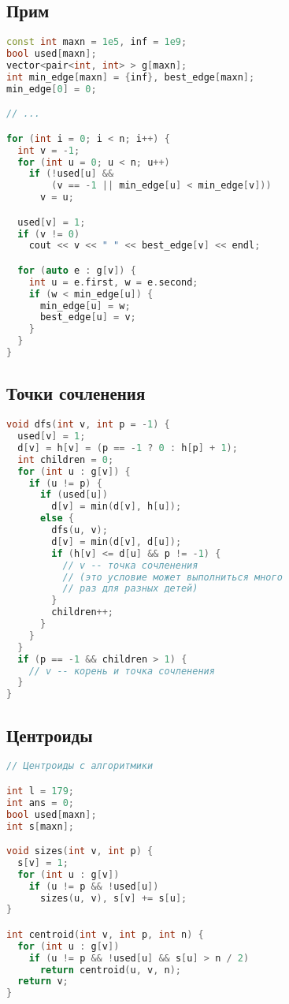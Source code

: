 \documentclass[10pt,a4paper,landscape,twosided]{extarticle}
\begin{document}
\begin{multicols}{3}
\subsection{Прим}
\begin{lstlisting}[language=C++]
const int maxn = 1e5, inf = 1e9;
bool used[maxn];
vector<pair<int, int> > g[maxn];
int min_edge[maxn] = {inf}, best_edge[maxn];
min_edge[0] = 0;

// ...

for (int i = 0; i < n; i++) {
  int v = -1;
  for (int u = 0; u < n; u++)
    if (!used[u] &&
        (v == -1 || min_edge[u] < min_edge[v]))
      v = u;

  used[v] = 1;
  if (v != 0)
    cout << v << " " << best_edge[v] << endl;

  for (auto e : g[v]) {
    int u = e.first, w = e.second;
    if (w < min_edge[u]) {
      min_edge[u] = w;
      best_edge[u] = v;
    }
  }
}
\end{lstlisting}

\subsection{Точки сочленения}
\begin{lstlisting}[language=C++]
void dfs(int v, int p = -1) {
  used[v] = 1;
  d[v] = h[v] = (p == -1 ? 0 : h[p] + 1);
  int children = 0;
  for (int u : g[v]) {
    if (u != p) {
      if (used[u])
        d[v] = min(d[v], h[u]);
      else {
        dfs(u, v);
        d[v] = min(d[v], d[u]);
        if (h[v] <= d[u] && p != -1) {
          // v -- точка сочленения
          // (это условие может выполниться много
          // раз для разных детей)
        }
        children++;
      }
    }
  }
  if (p == -1 && children > 1) {
    // v -- корень и точка сочленения
  }
}
\end{lstlisting}

\subsection{Центроиды}
\begin{lstlisting}[language=C++]
// Центроиды с алгоритмики

int l = 179;
int ans = 0;
bool used[maxn];
int s[maxn];

void sizes(int v, int p) {
  s[v] = 1;
  for (int u : g[v])
    if (u != p && !used[u])
      sizes(u, v), s[v] += s[u];
}

int centroid(int v, int p, int n) {
  for (int u : g[v])
    if (u != p && !used[u] && s[u] > n / 2)
      return centroid(u, v, n);
  return v;
}


\end{lstlisting}
\end{multicols}
\end{document}
